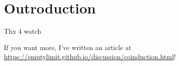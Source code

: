 \section{Outroduction} %

\begin{frame}{Thx 4 watch} %

  \par If you want more, I've written an article at \url{https://emptylimit.github.io/discussion/coinduction.html}!

  \vspace{\baselineskip}
  
  {\footnotesize
    \nocite{*}
    \printbibliography
  }

\end{frame}
